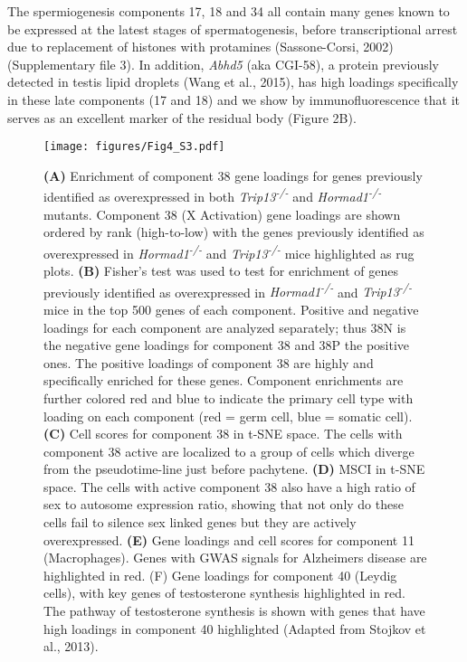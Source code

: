 The spermiogenesis components 17, 18 and 34 all contain many genes known to be expressed at the latest stages of spermatogenesis, before transcriptional arrest due to replacement of histones with protamines (Sassone-Corsi, 2002) (Supplementary file 3). In addition, \textit{Abhd5} (aka CGI-58), a protein previously detected in testis lipid droplets (Wang et al., 2015), has high loadings specifically in these late components (17 and 18) and we show by immunofluorescence that it serves as an excellent marker of the residual body (Figure 2B).


\begin{figure}[H]
	\centering
	\texttt{[image: figures/Fig4\_S3.pdf]}
	\caption{
		\textbf{(A)} Enrichment of component 38 gene loadings for genes previously identified as overexpressed in both \textit{Trip13\textsuperscript{-/-}} and \textit{Hormad1\textsuperscript{-/-}} mutants. Component 38 (X Activation) gene loadings are shown ordered by rank (high-to-low) with the genes previously identified as overexpressed in \textit{Hormad1\textsuperscript{-/-}} and \textit{Trip13\textsuperscript{-/-}} mice highlighted as rug plots.
		\textbf{(B)} Fisher’s test was used to test for enrichment of genes previously identified as overexpressed in \textit{Hormad1\textsuperscript{-/-}} and \textit{Trip13\textsuperscript{-/-}} mice in the top 500 genes of each component. Positive and negative loadings for each component are analyzed separately; thus 38N is the negative gene loadings for component 38 and 38P the positive ones. The positive loadings of component 38 are highly and specifically enriched for these genes. Component enrichments are further colored red and blue to indicate the primary cell type with loading on each component (red = germ cell, blue = somatic cell). 
		\textbf{(C)} Cell scores for component 38 in t-SNE space. The cells with component 38 active are localized to a group of cells which diverge from the pseudotime-line just before pachytene.
		\textbf{(D)} MSCI in t-SNE space. The cells with active component 38 also have a high ratio of sex to autosome expression ratio, showing that not only do these cells fail to silence sex linked genes but they are actively overexpressed.
		\textbf{(E)} Gene loadings and cell scores for component 11 (Macrophages). Genes with GWAS signals for Alzheimers disease are highlighted in red. (F) Gene loadings for component 40 (Leydig cells), with key genes of testosterone synthesis highlighted in red. The pathway of testosterone synthesis is shown with genes that have high loadings in component 40 highlighted (Adapted from Stojkov et al., 2013).
	}
	\label{fig:MiscComponents}
\end{figure}


